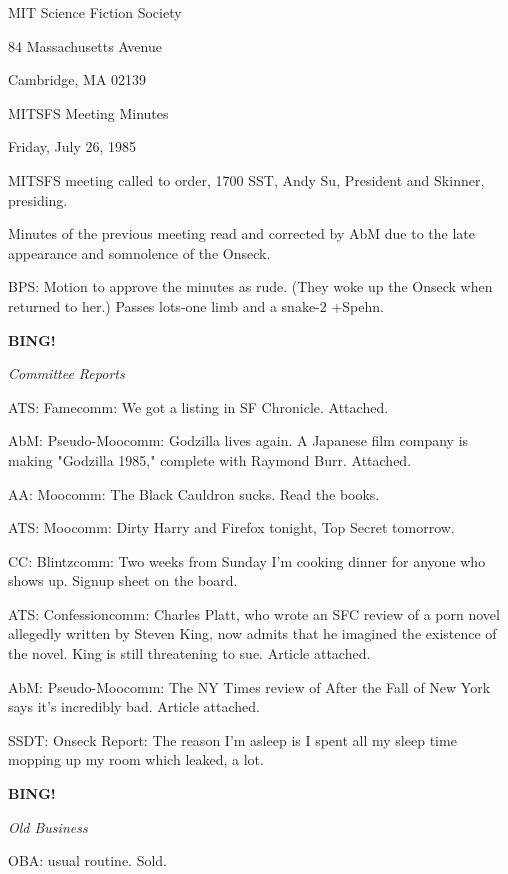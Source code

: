\documentclass[12pt]{article}
\newcommand{\bing}{{\bf BING!} }
\newcommand{\goto}[1]{\bing \vskip 12pt \centerline{{\em{#1}}}}
\begin{document}
\begin{center}

MIT Science Fiction Society 

84 Massachusetts Avenue

Cambridge, MA 02139

\vspace{12pt}

MITSFS Meeting Minutes 

Friday, July 26, 1985

\end{center}
 
\vspace{18pt}

\setlength{\parskip}{6pt}

\noindent
MITSFS meeting called to order, 1700 SST,
Andy Su, President and Skinner, presiding.

Minutes of the previous meeting read and corrected by AbM due to the late appearance and somnolence of the Onseck.

BPS: Motion to approve the minutes as rude. (They woke up the Onseck when returned to her.) Passes lots-one limb and a snake-2 +Spehn.

\goto{Committee Reports}

ATS: Famecomm: We got a listing in SF Chronicle. Attached.

AbM: Pseudo-Moocomm: Godzilla lives again. A Japanese film company is making "Godzilla 1985," complete with Raymond Burr. Attached.

AA: Moocomm: The Black Cauldron sucks. Read the books.

ATS: Moocomm: Dirty Harry and Firefox tonight, Top Secret tomorrow.

CC: Blintzcomm: Two weeks from Sunday I'm cooking dinner for anyone who shows up. Signup sheet on the board.

ATS: Confessioncomm: Charles Platt, who wrote an SFC review of a porn novel allegedly written by Steven King, now admits that he imagined the existence of the novel. King is still threatening to sue. Article attached.

AbM: Pseudo-Moocomm: The NY Times review of After the Fall of New York says it's incredibly bad. Article attached.

SSDT: Onseck Report: The reason I'm asleep is I spent all my sleep time mopping up my room which leaked, a lot.

\goto{Old Business}

OBA: usual routine. Sold.
\end{document}
